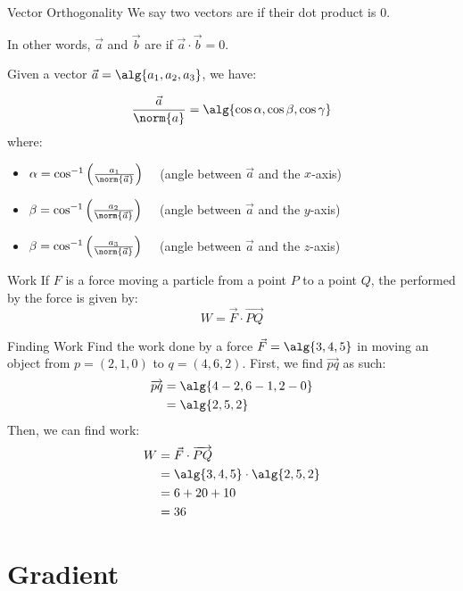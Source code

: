 \documentclass[math]{amznotes}
\begin{document}
\begin{dfnbox}{Vector Orthogonality}{}
    We say two vectors are  if their dot product is $0$.
\end{dfnbox}

In other words, $\vec{a}$ and $\vec{b}$ are  if $\vec{a} \cdot \vec{b} = 0$.

Given a vector $\vec{a} = \alg{a_1, a_2, a_3}$, we have:

\[ \frac{\vec{a}}{\norm{a}} = \alg{\cos \alpha, \cos \beta, \cos \gamma} \]
where:
\begin{itemize}
    \item $\alpha = \cos^{-1} \left( \frac{a_1}{\norm{\vec{a}}} \right) \quad$ (angle between $\vec{a}$ and the $x$-axis)
    \item $\beta = \cos^{-1} \left( \frac{a_2}{\norm{\vec{a}}} \right) \quad$ (angle between $\vec{a}$ and the $y$-axis)
    \item $\beta = \cos^{-1} \left( \frac{a_3}{\norm{\vec{a}}} \right) \quad$ (angle between $\vec{a}$ and the $z$-axis)
\end{itemize}

\begin{dfnbox}{Work}{}
    If $F$ is a force moving a particle from a point $P$ to a point $Q$, the  performed by the force is given by:
    \[ W = \vec{F} \cdot \overrightarrow{PQ} \]
\end{dfnbox}

\begin{exbox}{Finding Work}{}
    Find the work done by a force $\vec{F} = \alg{3,4,5}$ in moving an object from $p = (2,1,0)$ to $q = (4,6,2)$.
    \tcblower
    First, we find $\overrightarrow{pq}$ as such:
    \begin{align*}
        \overrightarrow{pq}
        &= \alg{4-2, 6-1, 2-0} \\
        &= \alg{2,5,2}
    \end{align*}
    Then, we can find work:
    \begin{align*}
        W
        &= \vec{F} \cdot \overrightarrow{PQ} \\
        &= \alg{3,4,5} \cdot \alg{2,5,2} \\
        &= 6 + 20 + 10 \\
        &= 36
    \end{align*}
\end{exbox}

\section{Gradient}
\end{document}
